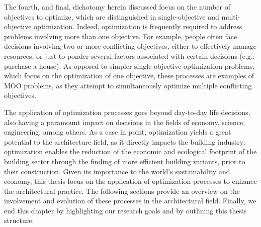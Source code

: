 	The fourth, and final, dichotomy herein discussed focus on the number of objectives to optimize, which are distinguished in single-objective and multi-objective optimization. Indeed, optimization is frequently required to address problems involving more than one objective. For example, people often face decisions involving two or more conflicting objectives, either to effectively manage resources, or just to ponder several factors associated with certain decisions (e.g.: purchase a house). As opposed to simpler single-objective optimization problems, which focus on the optimization of one objective, these processes are examples of \ac{MOO} problems, as they attempt to simultaneously optimize multiple conflicting objectives. %
	 
	
	The application of optimization processes goes beyond day-to-day life decisions, also having a paramount impact on decisions in the fields of economy, science, engineering, among others. As a case in point, optimization yields a great potential to the architecture field, as it directly impacts the building industry: optimization enables the reduction of the economic and ecological footprint of the building sector through the finding of more efficient building variants, prior to their construction. Given its importance to the world's sustainability and economy, this thesis focus on the application of optimization processes to enhance the architectural practice. The following sections provide an overview on the involvement and evolution of these processes in the architectural field. Finally, we end this chapter by highlighting our research goals and by outlining this thesis structure.

